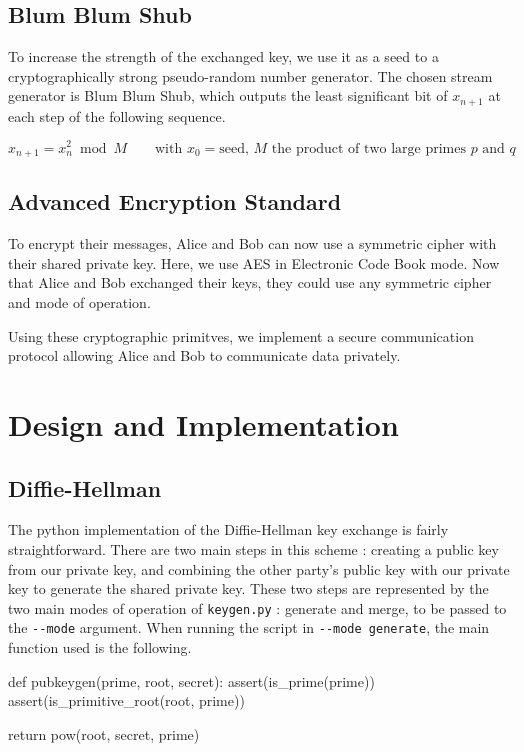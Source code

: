 \documentclass{article}
\begin{document}
\subsection{Blum Blum Shub}

To increase the strength of the exchanged key, we use it as a seed to a cryptographically strong pseudo-random number generator. The chosen stream generator is Blum Blum Shub\cite{Blum1986}, which outputs the least significant bit of $x_{{n+1}}$ at each step of the following sequence.

\begin{equation*}
    x_{n+1}=x_{n}^{2} \bmod M
    \quad \quad \text{with $x_{0} = \text{seed}$, $M$ the product of two large primes $p$ and $q$}
\end{equation*}

\subsection{Advanced Encryption Standard}

To encrypt their messages, Alice and Bob can now use a symmetric cipher with their shared private key. Here, we use AES in Electronic Code Book mode. Now that Alice and Bob exchanged their keys, they could use any symmetric cipher and mode of operation. 

Using these cryptographic primitves, we implement a secure communication protocol allowing Alice and Bob to communicate data privately.

\section{Design and Implementation}

\subsection{Diffie-Hellman}

The python implementation of the Diffie-Hellman key exchange is fairly straightforward. There are two main steps in this scheme : creating a public key from our private key, and combining the other party's public key with our private key to generate the shared private key. These two steps are represented by the two main modes of operation of \verb+keygen.py+ : generate and merge, to be passed to the \verb+--mode+ argument. When running the script in \verb+--mode generate+, the main function used is the following.

\bigskip
\begin{python}
def pubkeygen(prime, root, secret):
    assert(is_prime(prime))
    assert(is_primitive_root(root, prime))

    return pow(root, secret, prime)
\end{python}
\bigskip
\end{document}
